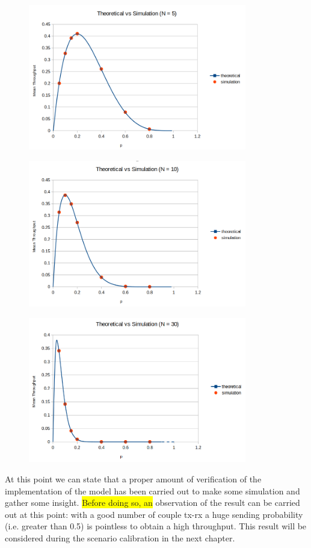 \begin{figure}[H]
	\centering
	\includegraphics[width=0.85\textwidth]{img/SecondVerificationN5.png}
\end{figure}
\begin{figure}[H]
	\centering
	\includegraphics[width=0.85\textwidth]{img/SecondVerificationN10.png}
\end{figure}
\begin{figure}[H]
	\centering
	\includegraphics[width=0.85\textwidth]{img/SecondVerificationN30.png}
\end{figure}

\noindent At this point we can state that a proper amount of verification of the implementation of the model has been carried out to make some simulation and gather some insight. \colorbox{yellow}{Before doing so, an} observation of the result can be carried out at this point: with a good number of couple tx-rx a huge sending probability (i.e. greater than 0.5) is pointless to obtain a high throughput. This result will be considered during the scenario calibration in the next chapter. 